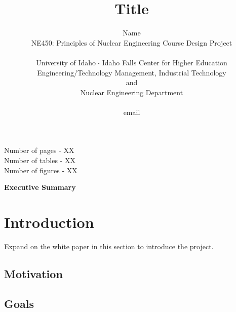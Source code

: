 \documentclass[11pt,a4paper]{article}
\newcommand*\sq{\mathbin{\vcenter{\hbox{\rule{.3ex}{.3ex}}}}} %
\begin{document}
\begin{titlepage}
    \title{Title}
    \author{
        Name \\
        NE450: Principles of Nuclear Engineering Course Design Project
        \\ \\
        University of Idaho $\sq$ Idaho Falls Center for Higher Education\\[0.05in]
        Engineering/Technology Management, Industrial Technology\\and\\Nuclear Engineering Department
        \\ \\
        email
    }
\clearpage %
\maketitle
\vspace*{\fill}
\begin{flushright}{
        \noindent Number of pages - XX \\
        \noindent Number of tables - XX \\
        \noindent Number of figures - XX
}
\end{flushright}
\thispagestyle{empty} %
\end{titlepage}

\onehalfspacing
\linenumbers
\pagewiselinenumbers
\modulolinenumbers[3] %

\noindent\Large{\textbf{Executive Summary}} \label{exec-summ} \\

\newpage

\section{Introduction} \label{introduction}
Expand on the white paper in this section to introduce the project.

\subsection{Motivation}

\subsection{Goals}

\newpage
\end{document}
